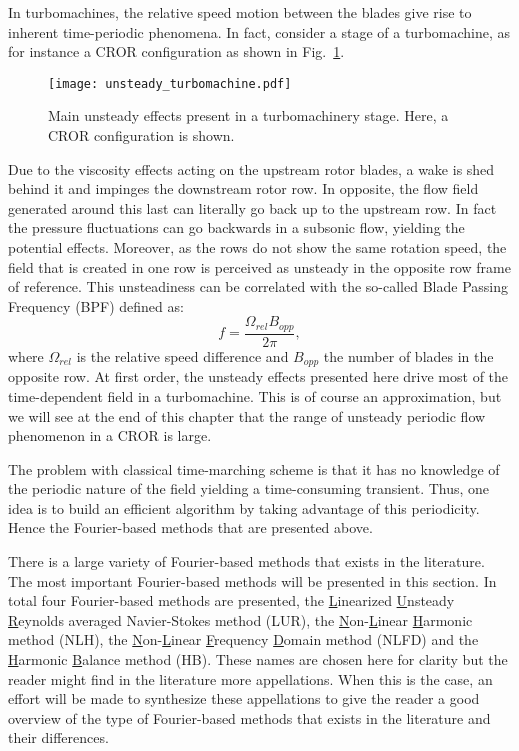 In turbomachines, the relative speed motion between the blades
give rise to inherent time-periodic phenomena.
In fact, consider a stage of a turbomachine, as for instance
a CROR configuration as shown 
in Fig.~\ref{fig:sm_unsteady_turbomachine}. 
\begin{figure}[htbp]
  \centering
  \texttt{[image: unsteady\_turbomachine.pdf]}
  \caption{Main unsteady effects present in a turbomachinery stage. Here, a CROR
  configuration is shown.}
  \label{fig:sm_unsteady_turbomachine}
\end{figure}
Due to the
viscosity effects acting on the upstream rotor blades, 
a wake is shed behind it and 
impinges the downstream rotor row. 
In opposite, the flow field
generated around this last can literally go back up
to the upstream row. In fact
the pressure fluctuations can go backwards in a subsonic flow, yielding
the potential effects. Moreover, as the rows do not 
show the same rotation speed,
the field that is created in one row is perceived as unsteady in the opposite 
row frame of reference. This unsteadiness can be
correlated with the so-called Blade Passing Frequency (BPF) defined as:
\begin{equation}
	f = \frac{\Omega_{rel} B_{opp}}{2 \pi},
\end{equation}
where $\Omega_{rel}$ is the relative speed difference 
and $B_{opp}$ the number of blades in the opposite row.
At first order, the unsteady effects presented here drive
most of the time-dependent field in a turbomachine. This 
is of course an approximation, but we will see at the end
of this chapter that the range of unsteady periodic
flow phenomenon in a CROR is large.

The problem with classical time-marching scheme is 
that it has no knowledge
of the periodic nature of the field yielding a time-consuming
transient. Thus, one idea is to build an efficient algorithm
by taking advantage of this periodicity. 
Hence the Fourier-based methods that are
presented above.

There is a large variety of Fourier-based methods that exists in the
literature. 
The most important Fourier-based methods will be presented in this section.
In total four Fourier-based methods are presented, 
the \underline{L}inearized \underline{U}nsteady 
\underline{R}eynolds averaged
Navier-Stokes method (LUR), 
the \underline{N}on-\underline{L}inear 
\underline{H}armonic method (NLH), the \underline{N}on-\underline{L}inear 
\underline{F}requency \underline{D}omain
method (NLFD) and the \underline{H}armonic \underline{B}alance 
method (HB).
These names are chosen here
for clarity but the reader might find in the literature more
appellations. When this is the case, an effort will be made to synthesize
these appellations to give the reader a good 
overview of the type of Fourier-based methods that exists in the literature
and their differences.

